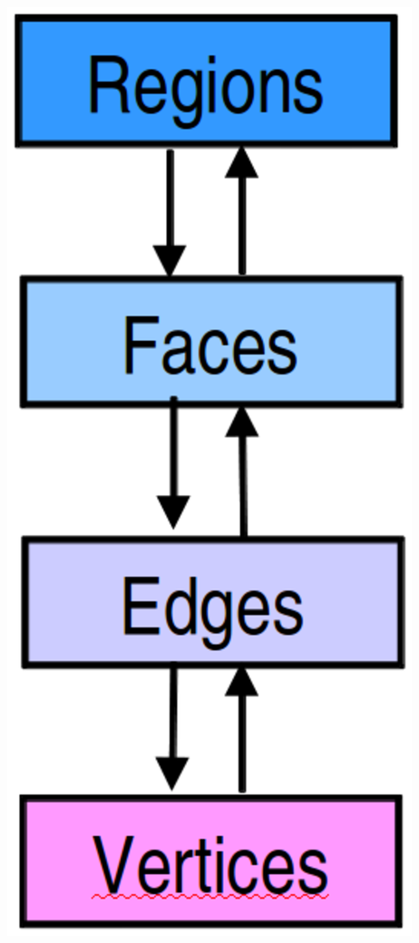 \documentclass{beamer}
\begin{document}
\begin{frame}
\begin{columns}
\begin{column}{0.1\textwidth}
      \includegraphics[width=\textwidth]{figs/meshAdj.eps}

\end{column}
\end{columns}
\end{frame}
\end{document}

